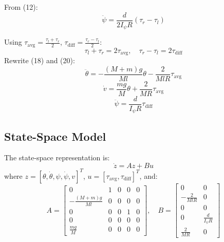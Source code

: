 \documentclass{article}
\begin{document}
From (12):
\begin{equation}
    \ddot{\psi} = \frac{d}{2 I_\psi R} (\tau_r - \tau_l)
\end{equation}

Using \( \tau_{\text{avg}} = \frac{\tau_l + \tau_r}{2} \), \( \tau_{\text{diff}} = \frac{\tau_r - \tau_l}{2} \):
\begin{equation}
    \tau_l + \tau_r = 2 \tau_{\text{avg}}, \quad \tau_r - \tau_l = 2 \tau_{\text{diff}}
\end{equation}
Rewrite (18) and (20):
\begin{equation}
    \ddot{\theta} = -\frac{(M + m) g}{M l} \theta - \frac{2}{M l R} \tau_{\text{avg}}
\end{equation}
\begin{equation}
    \dot{v} = \frac{m g}{M} \theta + \frac{2}{M R} \tau_{\text{avg}}
\end{equation}
\begin{equation}
    \ddot{\psi} = \frac{d}{I_\psi R} \tau_{\text{diff}}
\end{equation}

\subsection{State-Space Model}

The state-space representation is:
\begin{equation}
    \dot{z} = A z + B u
\end{equation}
where \( z = [\theta, \dot{\theta}, \psi, \dot{\psi}, v]^T \), \( u = [\tau_{\text{avg}}, \tau_{\text{diff}}]^T \), and:
\begin{equation}
    A = \begin{bmatrix}
        0 & 1 & 0 & 0 & 0 \\
        -\frac{(M + m) g}{M l} & 0 & 0 & 0 & 0 \\
        0 & 0 & 0 & 1 & 0 \\
        0 & 0 & 0 & 0 & 0 \\
        \frac{m g}{M} & 0 & 0 & 0 & 0
    \end{bmatrix}, \quad
    B = \begin{bmatrix}
        0 & 0 \\
        -\frac{2}{M l R} & 0 \\
        0 & 0 \\
        0 & \frac{d}{I_\psi R} \\
        \frac{2}{M R} & 0
    \end{bmatrix}
\end{equation}
\end{document}

